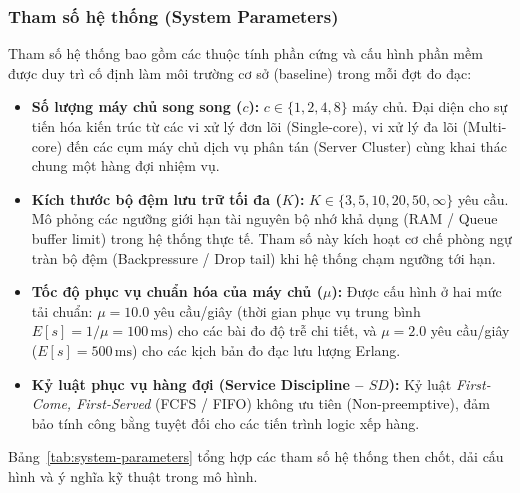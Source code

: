 \subsubsection{Tham số hệ thống (System Parameters)}
\hspace{0.5cm}Tham số hệ thống bao gồm các thuộc tính phần cứng và cấu hình phần mềm được duy trì cố định làm môi trường cơ sở (baseline) trong mỗi đợt đo đạc:
\begin{itemize}[leftmargin=1.5em]
    \item \textbf{Số lượng máy chủ song song ($c$):} $c \in \{1, 2, 4, 8\}$ máy chủ. Đại diện cho sự tiến hóa kiến trúc từ các vi xử lý đơn lõi (Single-core), vi xử lý đa lõi (Multi-core) đến các cụm máy chủ dịch vụ phân tán (Server Cluster) cùng khai thác chung một hàng đợi nhiệm vụ.
    \item \textbf{Kích thước bộ đệm lưu trữ tối đa ($K$):} $K \in \{3, 5, 10, 20, 50, \infty\}$ yêu cầu. Mô phỏng các ngưỡng giới hạn tài nguyên bộ nhớ khả dụng (RAM / Queue buffer limit) trong hệ thống thực tế. Tham số này kích hoạt cơ chế phòng ngự tràn bộ đệm (Backpressure / Drop tail) khi hệ thống chạm ngưỡng tới hạn.
    \item \textbf{Tốc độ phục vụ chuẩn hóa của máy chủ ($\mu$):} Được cấu hình ở hai mức tải chuẩn: $\mu = 10.0$ yêu cầu/giây (thời gian phục vụ trung bình $E[s] = 1/\mu = 100\,\text{ms}$) cho các bài đo độ trễ chi tiết, và $\mu = 2.0$ yêu cầu/giây ($E[s] = 500\,\text{ms}$) cho các kịch bản đo đạc lưu lượng Erlang.
    \item \textbf{Kỷ luật phục vụ hàng đợi (Service Discipline -- $SD$):} Kỷ luật \textit{First-Come, First-Served} (FCFS / FIFO) không ưu tiên (Non-preemptive), đảm bảo tính công bằng tuyệt đối cho các tiến trình logic xếp hàng.
\end{itemize}

Bảng~\ref{tab:system-parameters} tổng hợp các tham số hệ thống then chốt, dải cấu hình và ý nghĩa kỹ thuật trong mô hình.

